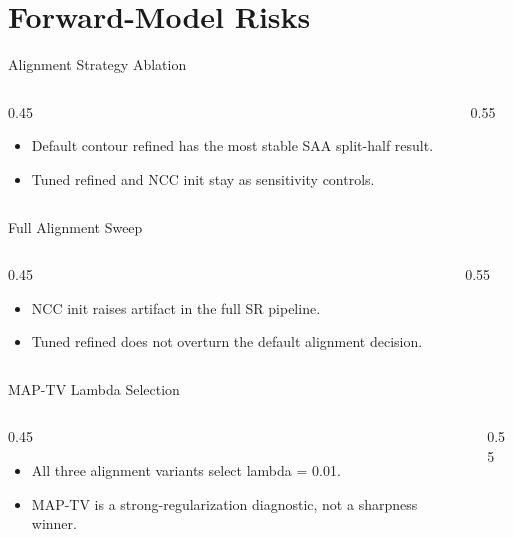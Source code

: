 \section{Forward-Model Risks}

\begin{frame}{Alignment Strategy Ablation}
  \begin{columns}[c]
    \begin{column}{0.45\textwidth}
      \begin{itemize}
        \item Default contour refined has the most stable SAA split-half result.
        \item Tuned refined and NCC init stay as sensitivity controls.
      \end{itemize}
    \end{column}
    \begin{column}{0.55\textwidth}
      \centering
    \end{column}
  \end{columns}
\end{frame}

\begin{frame}{Full Alignment Sweep}
  \begin{columns}[c]
    \begin{column}{0.45\textwidth}
      \begin{itemize}
        \item NCC init raises artifact in the full SR pipeline.
        \item Tuned refined does not overturn the default alignment decision.
      \end{itemize}
    \end{column}
    \begin{column}{0.55\textwidth}
      \centering
    \end{column}
  \end{columns}
\end{frame}

\begin{frame}{MAP-TV Lambda Selection}
  \begin{columns}[c]
    \begin{column}{0.45\textwidth}
      \begin{itemize}
        \item All three alignment variants select lambda = 0.01.
        \item MAP-TV is a strong-regularization diagnostic, not a sharpness winner.
      \end{itemize}
    \end{column}
    \begin{column}{0.55\textwidth}
      \centering
    \end{column}
  \end{columns}
\end{frame}
